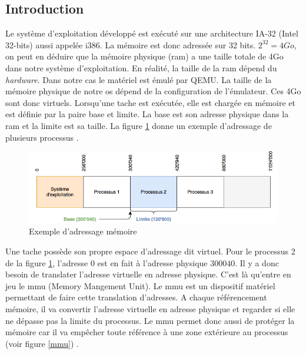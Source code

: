 
\subsection{Introduction}
Le système d'exploitation développé est exécuté sur une architecture \acrshort{IA-32}
(Intel 32-bits) aussi appelée i386. La mémoire est donc adressée sur 32 bits.
$2^{32}=4Go$, on peut en déduire que la mémoire physique (\acrshort{ram}) a une
taille totale de 4Go dans notre système d'exploitation. En réalité, la taille de
la \acrshort{ram} dépend du \textit{hardware}. Dans notre cas le matériel est émulé
par QEMU. La taille de la mémoire physique de notre \acrshort{os} dépend de
la configuration de l'émulateur. Ces 4Go sont donc virtuels. Lorsqu'une tache est
exécutée, elle est chargée en mémoire et est définie par la paire base et limite.
La base est son adresse physique dans la \acrshort{ram} et la limite est sa taille.
La figure \ref{ex_base_limit} donne un exemple d'adressage de plusieurs processus
\cite{ref42}.

\begin{figure}[!h]
  \centering
  \includegraphics[scale=0.6]{images/ex_base_limit.png}
  \caption{Exemple d'adressage mémoire}
  \label{ex_base_limit}
\end{figure}

Une tache possède son propre espace d'adressage dit virtuel. Pour le processus 2
de la figure \ref{ex_base_limit}, l'adresse $0$ est en fait à l'adresse physique
$300040$. Il y a donc besoin de translater l'adresse virtuelle en adresse physique.
C'est là qu'entre en jeu le \acrshort{mmu} (Memory Mangement Unit). Le \acrshort{mmu}
est un dispositif matériel permettant de faire cette translation d'adresses. A chaque
référencement mémoire, il va convertir l'adresse virtuelle en adresse physique et
regarder si elle ne dépasse pas la limite du processus. Le \acrshort{mmu} permet donc
aussi de protéger la mémoire car il va empêcher toute référence à une zone extérieure
au processus (voir figure \ref{mmu}) \cite{ref42}.


